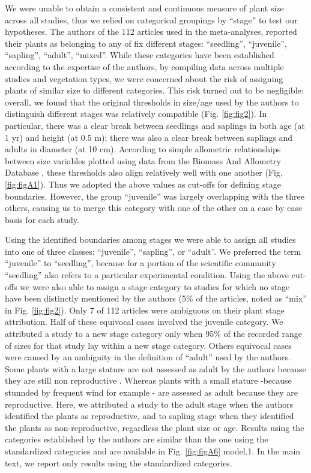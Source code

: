 \documentclass[a4paper,11pt]{article}
\begin{document}
We were unable to obtain a consistent and continuous measure of plant size across all studies, thus we relied on categorical groupings by ``stage'' to test our hypotheses. The authors of the 112 articles used in the meta-analyses, reported their plants as belonging to any of fix different stages: ``seedling'', ``juvenile'', ``sapling'', ``adult'', ``mixed''. While these categories have been established according to the expertise of the authors, by compiling data across multiple studies and vegetation types, we were concerned about the risk of assigning plants of similar size to different categories. This risk turned out to be negligible: overall, we found that the original thresholds in size/age used by the authors to distinguish different stages was relatively compatible (Fig. \ref{fig:fig2}). In particular, there was a clear break between seedlings and saplings in both age (at 1 yr) and height (at 0.5 m); there was also a clear break between saplings and adults in diameter (at 10 cm). According to simple allometric relationships between size variables plotted using data from the Biomass And Allometry Database \citep{Falster:2015}, these thresholds also align relatively well with one another (Fig. \ref{fig:figA1}). Thus we adopted the above values as cut-offs for defining stage boundaries. However, the group ``juvenile'' was largely overlapping with the three others, causing us to merge this category with one of the other on a case by case basis for each study.

Using the identified boundaries among stages we were able to assign all studies into one of three classes: ``juvenile'', ``sapling'', or ``adult''.  We preferred the term ``juvenile'' to ``seedling'', because for a portion of the scientific community ``seedling'' also refers to a particular experimental condition. Using the above cut-offs we were also able to assign a stage category to studies for which no stage have been distinctly mentioned by the authors (5\% of the articles, noted as ``mix'' in Fig. \ref{fig:fig2}). Only 7 of 112 articles were ambiguous on their plant stage attribution. Half of these equivocal cases involved the juvenile category. We attributed a study to a new stage category only when 95\% of the recorded range of sizes for that study lay within a new stage category. Others equivocal cases were caused by an ambiguity in the definition of ``adult'' used by the authors. Some plants with a large stature are not assessed as adult by the authors because they are still non reproductive \citep{King:2006dg,King:2006he}. Whereas plants with a small stature -because stunnded by frequent wind for example \citep{Stratton:2001ck}- are assessed as adult because they are reproductive. Here, we attributed a study to the adult stage when the authors identified the plants as reproductive, and to sapling stage when they identified the plants as non-reproductive, regardless the plant size or age. Results using the categories established by the authors are similar than the one using the standardized categories and are available in Fig. \ref{fig:figA6} model.1. In the main text, we report only results using the standardized categories.
\end{document}
